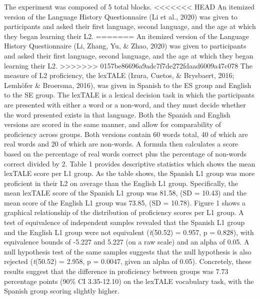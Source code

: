 \documentclass[
  english,
  man]{apa6}
\begin{document}
The experiment was composed of 5 total blocks.
<<<<<<< HEAD
An itemized version of the Language History Questionnaire (Li et al., 2020) was given to participants and asked their first language, second language, and the age at which they began learning their L2.
=======
An itemized version of the Language History Questionnaire (Li, Zhang, Yu, \& Zhao, 2020) was given to participants and asked their first language, second language, and the age at which they began learning their L2.
>>>>>>> 0157be86696a9adc7f7de272fdaad6009a47c078
The measure of L2 proficiency, the lexTALE (Izura, Cuetos, \& Brysbaert, 2016; Lemhöfer \& Broersma, 2016), was given in Spanish to the ES group and English to the SE group.
The lexTALE is a lexical decision task in which the participants are presented with either a word or a non-word, and they must decide whether the word presented exists in that language.
Both the Spanish and English versions are scored in the same manner, and allow for comparability of proficiency across groups. Both versions contain 60 words total, 40 of which are real words and 20 of which are non-words. A formula then calculates a score based on the percentage of real words correct plus the percentage of non-words correct divided by 2. Table 1 provides descriptive statistics which shows the mean lexTALE score per L1 group. As the table shows, the Spanish L1 group was more proficient in their L2 on average than the English L1 group. Specifically, the mean lexTALE score of the Spanish L1 group was 81.58, (SD = 10.43) and the mean score of the English L1 group was 73.85, (SD = 10.78).
Figure 1 shows a graphical relationship of the distribution of proficiency scores per L1 group. A test of equivalence of independent samples revealed that the Spanish L1 group and the English L1 group were not equivalent (\emph{t}(50.52) = 0.957, p = 0.828), with equivalence bounds of -5.227 and 5.227 (on a raw scale) and an alpha of 0.05. A null hypothesis test of the same samples suggests that the null hypothesis is also rejected (\emph{t}(50.52) = 2.958, p = 0.0047, given an alpha of 0.05). Concretely, these results suggest that the difference in proficiency between groups was 7.73 percentage points (90\% CI 3.35-12.10) on the lexTALE vocabulary task, with the Spanish group scoring slightly higher.
\end{document}
